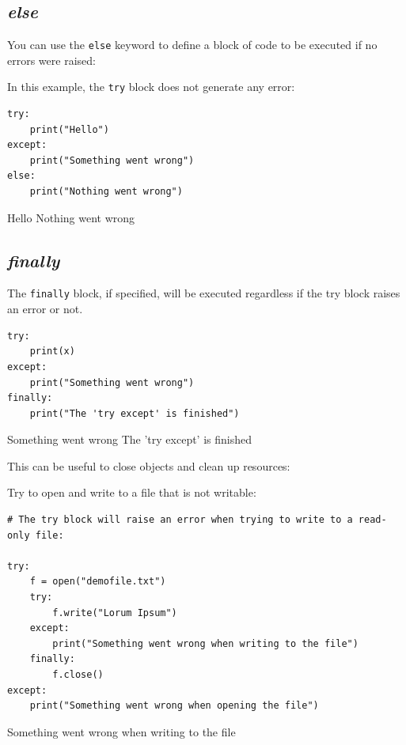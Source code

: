 \documentclass[12pt,a4paper]{article}
\newcommand{\code}[1]{%
	\colorbox{backcolour}{\lstinline{#1}}%
}
\newcommand{\lcode}[1]{%
	\lstinline{#1}%
}
\begin{document}
\subsection{\textit{else}}

You can use the \code{else} keyword to define a block of code to be executed if
no errors were raised:

\begin{ebox}
In this example, the \lcode{try} block does not generate any error:
	\begin{lstlisting}
try:
    print("Hello")
except:
    print("Something went wrong")
else:
    print("Nothing went wrong")
	\end{lstlisting}
\tcblower
	\begin{vercode}
Hello
Nothing went wrong
	\end{vercode}
\end{ebox}
\subsection{\textit{finally}}

The \code{finally} block, if specified, will be executed regardless if the try
block raises an error or not.

\begin{ebox}
	\begin{lstlisting}
try:
    print(x)
except:
    print("Something went wrong")
finally:
    print("The 'try except' is finished") 
	\end{lstlisting}
\tcblower
	\begin{vercode}
Something went wrong
The 'try except' is finished
	\end{vercode}
\end{ebox}

This can be useful to close objects and clean up resources:

\begin{ebox}
Try to open and write to a file that is not writable:
	\begin{lstlisting}
# The try block will raise an error when trying to write to a read-only file:

try:
    f = open("demofile.txt")
    try:
        f.write("Lorum Ipsum")
    except:
        print("Something went wrong when writing to the file")
    finally:
        f.close()
except:
    print("Something went wrong when opening the file")
	\end{lstlisting}
\tcblower
	\begin{vercode}
Something went wrong when writing to the file
	\end{vercode}
\end{ebox}
\end{document}
